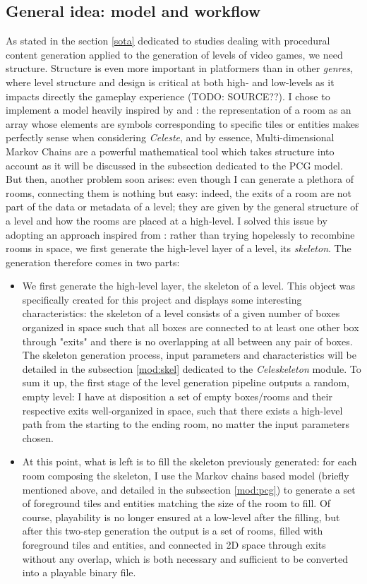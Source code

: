 \documentclass{article}
\newcommand{\Celnosp}{\textit{Celeste}}
\begin{document}
\subsection{General idea: model and workflow}
As stated in the section \ref{sota} dedicated to studies dealing with procedural content generation applied to the generation of levels of video games, we need structure. Structure is even more important in platformers than in other \textit{genres}, where level structure and design is critical at both high- and low-levels as it impacts directly the gameplay experience (TODO: SOURCE??). I chose to implement a model heavily inspired by \cite{MC} and \cite{snod}: the representation of a room as an array whose elements are symbols corresponding to specific tiles or entities makes perfectly sense when considering \Celnosp, and by essence, Multi-dimensional Markov Chains are a powerful mathematical tool which takes structure into account as it will be discussed in the subsection dedicated to the PCG model. But then, another problem soon arises: even though I can generate a plethora of rooms, connecting them is nothing but easy: indeed, the exits of a room are not part of the data or metadata of a level; they are given by the general structure of a level and how the rooms are placed at a high-level. I solved this issue by adopting an approach inspired from \cite{spe}: rather than trying hopelessly to recombine rooms in space, we first generate the high-level layer of a level, its \textit{skeleton}. The generation therefore comes in two parts: 
\begin{itemize}
    \item We first generate the high-level layer, the skeleton of a level. This object was specifically created for this project and displays some interesting characteristics: the skeleton of a level consists of a given number of boxes organized in space such that all boxes are connected to at least one other box through "exits" and there is no overlapping at all between any pair of boxes. The skeleton generation process, input parameters and characteristics will be detailed in the subsection \ref{mod:skel} dedicated to the \textit{Celeskeleton} module. To sum it up, the first stage of the level generation pipeline outputs a random, empty level: I have at disposition a set of empty boxes/rooms and their respective exits well-organized in space, such that there exists a high-level path from the starting to the ending room, no matter the input parameters chosen.
    \item At this point, what is left is to fill the skeleton previously generated: for each room composing the skeleton, I use the Markov chains based model (briefly mentioned above, and detailed in the subsection \ref{mod:pcg}) to generate a set of foreground tiles and entities matching the size of the room to fill. Of course, playability is no longer ensured at a low-level after the filling, but after this two-step generation the output is a set of rooms, filled with foreground tiles and entities, and connected in 2D space through exits without any overlap, which is both necessary and sufficient to be converted into a playable binary file.
\end{itemize}
\end{document}
